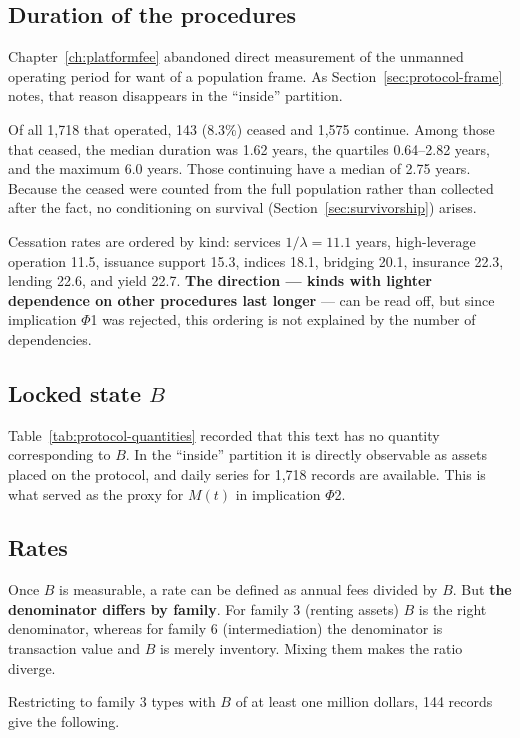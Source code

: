 \subsection{Duration of the procedures}
Chapter~\ref{ch:platformfee} abandoned direct measurement of the unmanned operating period
for want of a population frame. As Section~\ref{sec:protocol-frame} notes, that reason
disappears in the ``inside'' partition.

Of all 1{,}718 that operated, 143 (8.3\%) ceased and 1{,}575 continue. Among those that
ceased, the median duration was 1.62 years, the quartiles 0.64--2.82 years, and the maximum
6.0 years. Those continuing have a median of 2.75 years. Because the ceased were counted from
the full population rather than collected after the fact, no conditioning on survival
(Section~\ref{sec:survivorship}) arises.

Cessation rates are ordered by kind: services $1/\lambda=11.1$ years, high-leverage operation
11.5, issuance support 15.3, indices 18.1, bridging 20.1, insurance 22.3, lending 22.6, and
yield 22.7. \textbf{The direction --- kinds with lighter dependence on other procedures last
longer} --- can be read off, but since implication $\Phi$1 was rejected, this ordering is not
explained by the number of dependencies.

\subsection{Locked state $B$}
Table~\ref{tab:protocol-quantities} recorded that this text has no quantity corresponding to
$B$. In the ``inside'' partition it is directly observable as assets placed on the protocol,
and daily series for 1{,}718 records are available. This is what served as the proxy for
$M(t)$ in implication $\Phi$2.

\subsection{Rates}
Once $B$ is measurable, a rate can be defined as annual fees divided by $B$. But
\textbf{the denominator differs by family}. For family 3 (renting assets) $B$ is the right
denominator, whereas for family 6 (intermediation) the denominator is transaction value and
$B$ is merely inventory. Mixing them makes the ratio diverge.

Restricting to family 3 types with $B$ of at least one million dollars, 144 records give the
following.

